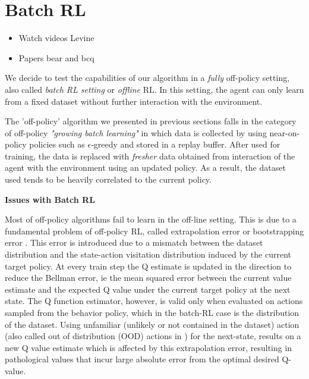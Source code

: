 \chapter{Batch RL}
\begin{itemize}
    \item Watch videos Levine
    \item Papers bear and bcq
    
\end{itemize}

We decide to test the capabilities of our algorithm in a \textit{fully} off-policy setting, 
also called \textit{batch RL setting} or \textit{offline} RL. In this setting, the agent 
can only learn from a fixed dataset without further interaction with the environment.


The 'off-policy' algorithm we presented in previous sections falls in the category of 
off-policy \textit{"growing batch learning"} in which data is collected by using near-on-policy
policies such as $\epsilon$-greedy and stored in a replay buffer.
After used for training, the data is replaced with \textit{fresher} data obtained from
interaction of the agent with the environment using an updated policy.
As a result, the dataset used tends to be heavily correlated to the current policy.


\textbf{Issues with Batch RL}

Most of off-policy algorithms fail to learn in the off-line setting. 
This is due to a fundamental problem of off-policy RL, called extrapolation error \citep{Fujimoto2019} or 
bootstrapping error \citep{Kumar2019}. This error is introduced due to a mismatch
between the dataset distribution and the state-action visitation distribution induced by the
current target policy.
At every train step the Q estimate is updated in the direction to reduce
the Bellman error, ie the mean squared error between the current value estimate and
the expected Q value under the current target policy at the next state.
The Q function estimator, however, is valid only when evaluated on actions sampled from the behavior policy,
which in the batch-RL case is the distribution of the dataset.
Using unfamiliar (unlikely or not contained in the dataset) action
(also called out of distribution (OOD) actions in \citep{Kumar2019}) for the next-state,
results on a new Q value estimate which is affected by this extrapolation error,
resulting in pathological values that incur large absolute error from the optimal desired Q-value.

